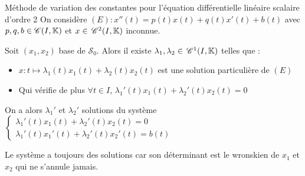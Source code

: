 \begin{theorement}{Méthode de variation des constantes pour l'équation différentielle linéaire scalaire d'ordre 2}{}
    On considère $(E) : x''(t) = p(t) x(t) + q(t) x'(t) + b(t)$ avec $p, q, b \in \mathscr C(I, \mathbb{K})$ et $x \in \,\mathscr C^{2}(I, \mathbb{K})$ inconnue.

    \svspace
    
    Soit $(x_1, x_2)$ base de $\mathscr S_0$. Alors il existe 
    $\lambda_1, \lambda_2 \in \,\mathscr C^{1}(I, \mathbb{K})$ telles que :
    \begin{itemize}
        \item $x : t \mapsto \lambda_1(t) x_1(t) + \lambda_2(t) x_2(t)$ est une solution particulière de $(E)$
        \item Qui vérifie de plus $\forall t \in I$, $\lambda_1'(t) x_1(t) + \lambda_2'(t) x_2(t) = 0$
    \end{itemize}

    \svspace

    On a alors $\lambda_1'$ et $\lambda_2'$ solutions du système 
    $\begin{cases}
    \lambda_1'(t) x_1(t) + \lambda_2'(t) x_2(t) = 0 \\
    \lambda_1'(t) x_1'(t) + \lambda_2'(t) x_2'(t) = b(t)
    \end{cases}$
\end{theorement}

\begin{remarque}
    Le système a toujours des solutions car son déterminant est le wronskien de $x_1$ et $x_2$ qui ne s'annule jamais.
\end{remarque}


